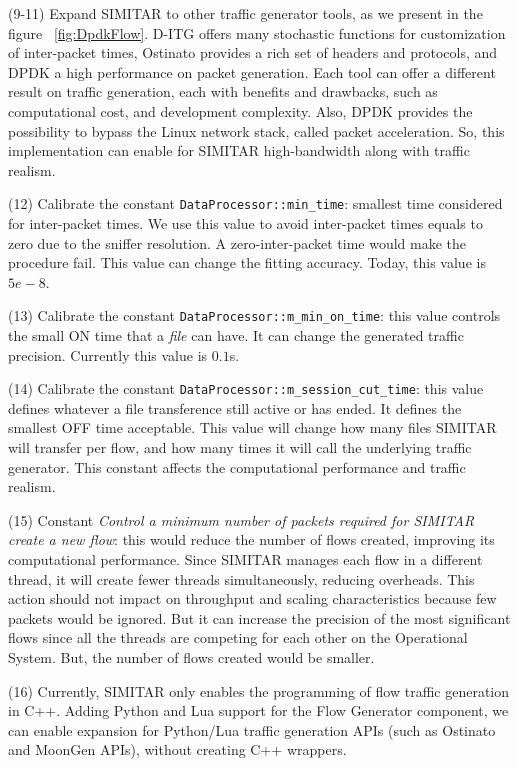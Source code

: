 (9-11) Expand SIMITAR to other traffic generator tools, as we present in the figure ~\ref{fig:DpdkFlow}. D-ITG offers many stochastic functions for customization of inter-packet times, Ostinato provides a rich set of headers and protocols, and DPDK a high performance on packet generation. Each tool can offer a different result on traffic generation, each with benefits and drawbacks, such as computational cost, and development complexity.  Also, DPDK provides the possibility to bypass the Linux network stack, called packet acceleration. So, this implementation can enable for SIMITAR high-bandwidth along with traffic realism.


(12) Calibrate  the constant  \texttt{DataProcessor::min\_time}: smallest time considered for inter-packet times. We use this value to avoid inter-packet times equals to zero due to the sniffer resolution. A zero-inter-packet time would make the procedure fail.  This value can change the fitting accuracy. Today, this value is $5e-8$.


(13) Calibrate  the constant \texttt{DataProcessor::m\_min\_on\_time}: this value controls the small ON time that a \textit{file} can have. It can change the generated traffic precision. Currently this value is $0.1$s. 


(14) Calibrate  the constant \texttt{DataProcessor::m\_session\_cut\_time}: this value defines whatever a file transference still active or has ended. It defines the smallest OFF time acceptable. This value will change how many files SIMITAR will transfer per flow, and how many times it will call the underlying traffic generator. This constant affects the computational performance and traffic realism.


(15) Constant \textit{Control a minimum number of packets required for SIMITAR create a new flow}: this would reduce the number of flows created, improving its computational performance. Since SIMITAR manages each flow in a different thread, it will create fewer threads simultaneously, reducing overheads. This action should not impact on throughput and scaling characteristics because few packets would be ignored. But it can increase the precision of the most significant flows since all the threads are competing for each other on the Operational System. But, the number of flows created would be smaller.


(16) Currently, SIMITAR only enables the programming of flow traffic generation in C++. Adding Python and Lua support for the Flow Generator component, we can enable expansion for Python/Lua traffic generation APIs (such as Ostinato and MoonGen APIs), without creating C++ wrappers.


